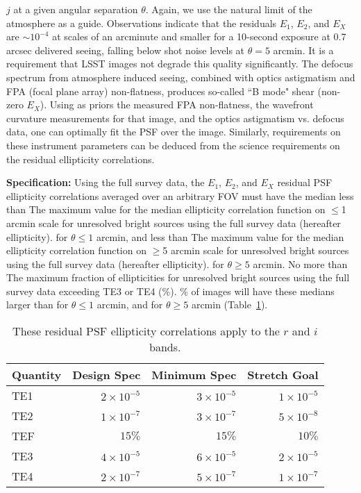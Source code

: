 $j$ at a given angular separation $\theta$.  Again, we use the natural
limit of the atmosphere as a guide.  Observations indicate that the residuals $E_1$,
$E_2$, and $E_X$ are $\sim 10^{-4}$ at scales of an arcminute and smaller for
a 10-second exposure at 0.7 arcsec delivered seeing, falling below shot noise
levels at $\theta = 5$ arcmin.  It is a requirement that LSST images not degrade
this quality significantly. The defocus spectrum from atmosphere induced seeing,
combined with optics astigmatism and FPA (focal plane array) non-flatness, produces
so-called ``B mode" shear (non-zero $E_X$). Using as priors the measured FPA non-flatness, the wavefront
curvature measurements for that image, and the optics astigmatism vs. defocus
data,
one can optimally fit the PSF over the image. Similarly, requirements on these
instrument parameters can be deduced from the science requirements on the
residual ellipticity correlations.



{\bf Specification:} Using the full survey data, the $E_1$, $E_2$, and
$E_X$ residual PSF ellipticity correlations
averaged over an arbitrary FOV must have the median less than
{The maximum value for the median ellipticity correlation function
on $\le$1 arcmin scale for unresolved bright sources using the full survey data
(hereafter ellipticity).}
for $\theta \le 1$ arcmin, and less than
{The maximum value for the median ellipticity correlation function
on $\ge$5 arcmin scale for unresolved bright sources using the full survey data
(hereafter ellipticity).}
for $\theta \ge 5$ arcmin. No more than
{The maximum fraction of ellipticities for unresolved bright sources using the
full survey data exceeding TE3 or TE4 (\%).}
\% of images will have these medians larger than
for $\theta \le 1$ arcmin, and
for $\theta \ge 5$ arcmin (Table~\ref{fullEllip}).

\begin{table}[h]
\begin{tabular}{|l|r|r|r|}
\hline
Quantity       &   Design Spec & Minimum Spec  & Stretch Goal \\
\hline
      TE1 & $2 \times 10^{-5}$  & $3 \times 10^{-5}$ & $1 \times 10^{-5}$ \\
      TE2 & $1 \times 10^{-7}$  & $3 \times 10^{-7}$ & $5 \times 10^{-8}$ \\
      TEF & $15\%$              & $15\%$             & $10\%$             \\
      TE3 & $4 \times 10^{-5}$  & $6 \times 10^{-5}$ & $2 \times 10^{-5}$ \\
      TE4 & $2 \times 10^{-7}$  & $5 \times 10^{-7}$ & $1 \times 10^{-7}$ \\
\hline
\end{tabular}
\caption{These residual PSF ellipticity correlations apply to the $r$ and $i$ bands.}
\label{fullEllip}
\end{table}

